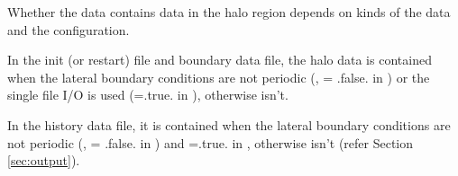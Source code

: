 Whether the data contains data in the halo region depends on kinds of the data and the configuration.

In the init (or restart) file and boundary data file, the halo data is contained when the lateral boundary conditions are not periodic (,  = .false. in ) or the single file I/O is used (=.true. in ), otherwise isn't.

In the history data file, it is contained when the lateral boundary conditions are not periodic (,  = .false. in ) and =.true. in  , otherwise isn't (refer Section \ref{sec:output}).



